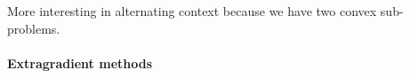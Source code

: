 \begin{ndrva}
  More interesting in alternating context because we have two convex sub-problems.
\end{ndrva}

\paragraph{Extragradient methods}


